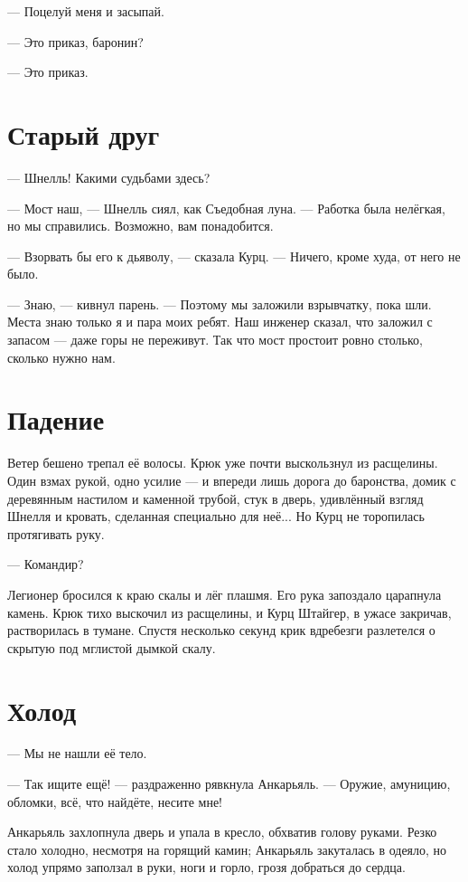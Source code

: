 \documentclass[a4paper,10pt,fleqn]{book}\usepackage{polyglossia}\setdefaultlanguage{english}\setotherlanguage{russian}\defaultfontfeatures{Ligatures=TeX,Mapping=tex-text}\usepackage{xcolor}\definecolor{lightgray}{HTML}{bbbbbb}\color{lightgray}\newcommand{\ml}[3]{\textcolor{black}{#3}}
\begin{document}
--- Поцелуй меня и засыпай.

--- Это приказ, баронин?

--- Это приказ.

\section{Старый друг}

--- Шнелль!
Какими судьбами здесь?

--- Мост наш, --- Шнелль сиял, как Съедобная луна.
--- Работка была нелёгкая, но мы справились.
Возможно, вам понадобится.

--- Взорвать бы его к дьяволу, --- сказала Курц.
--- Ничего, кроме худа, от него не было.

--- Знаю, --- кивнул парень.
--- Поэтому мы заложили взрывчатку, пока шли.
Места знаю только я и пара моих ребят.
Наш инженер сказал, что заложил с запасом --- даже горы не переживут.
Так что мост простоит ровно столько, сколько нужно нам.

\section{Падение}

Ветер бешено трепал её волосы.
Крюк уже почти выскользнул из расщелины.
Один взмах рукой, одно усилие --- и впереди лишь дорога до баронства, домик с деревянным настилом и каменной трубой, стук в дверь, удивлённый взгляд Шнелля и кровать, сделанная специально для неё...
Но Курц не торопилась протягивать руку.

--- Командир?

Легионер бросился к краю скалы и лёг плашмя.
Его рука запоздало царапнула камень.
Крюк тихо выскочил из расщелины, и Курц Штайгер, в ужасе закричав, растворилась в тумане.
Спустя несколько секунд крик вдребезги разлетелся о скрытую под мглистой дымкой скалу. 

\section{Холод}

--- Мы не нашли её тело.

--- Так ищите ещё! --- раздраженно рявкнула Анкарьяль.
--- Оружие, амуницию, обломки, всё, что найдёте, несите мне!

Анкарьяль захлопнула дверь и упала в кресло, обхватив голову руками.
Резко стало холодно, несмотря на горящий камин;
Анкарьяль закуталась в одеяло, но холод упрямо заползал в руки, ноги и горло, грозя добраться до сердца.
\end{document}
